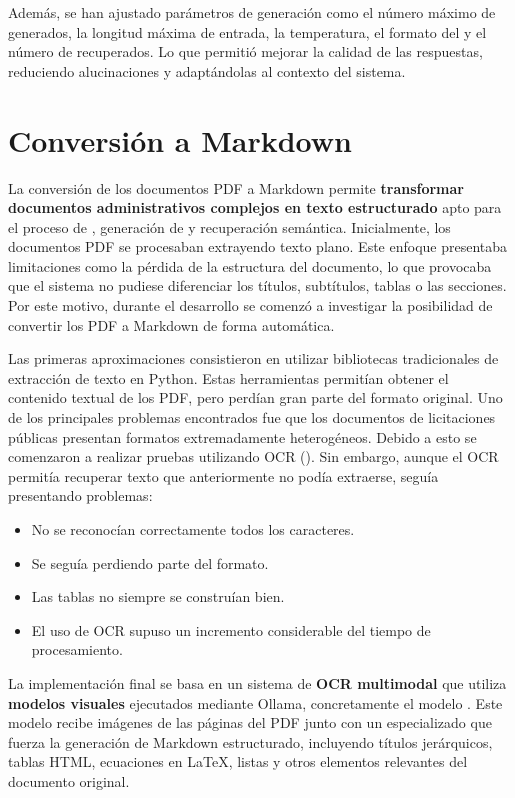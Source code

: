 Además, se han ajustado parámetros de generación como el número máximo de  generados, la longitud máxima de entrada, la temperatura, el formato del  y el número de  recuperados. Lo que permitió mejorar la calidad de las respuestas, reduciendo alucinaciones y adaptándolas al contexto del sistema.


\section{Conversión a Markdown}

La conversión de los documentos PDF a Markdown permite \textbf{transformar documentos administrativos complejos en texto estructurado} apto para el proceso de , generación de  y recuperación semántica. Inicialmente, los documentos PDF se procesaban extrayendo texto plano. Este enfoque presentaba limitaciones como la pérdida de la estructura del documento, lo que provocaba que el sistema no pudiese diferenciar los títulos, subtítulos, tablas o las secciones. Por este motivo, durante el desarrollo se comenzó a investigar la posibilidad de convertir los PDF a Markdown de forma automática.

Las primeras aproximaciones consistieron en utilizar bibliotecas tradicionales de extracción de texto en Python. Estas herramientas permitían obtener el contenido textual de los PDF, pero perdían gran parte del formato original. Uno de los principales problemas encontrados fue que los documentos de licitaciones públicas presentan formatos extremadamente heterogéneos. Debido a esto se comenzaron a realizar pruebas utilizando OCR (). Sin embargo, aunque el OCR permitía recuperar texto que anteriormente no podía extraerse, seguía presentando problemas:
\begin{itemize}
	\item No se reconocían correctamente todos los caracteres.
	\item Se seguía perdiendo parte del formato.
	\item Las tablas no siempre se construían bien.
	\item El uso de OCR supuso un incremento considerable del tiempo de procesamiento.
\end{itemize}

La implementación final se basa en un sistema de \textbf{OCR multimodal} que utiliza \textbf{modelos visuales} ejecutados mediante Ollama, concretamente el modelo . Este modelo recibe imágenes de las páginas del PDF junto con un  especializado que fuerza la generación de Markdown estructurado, incluyendo títulos jerárquicos, tablas HTML, ecuaciones en \LaTeX{}, listas y otros elementos relevantes del documento original.

